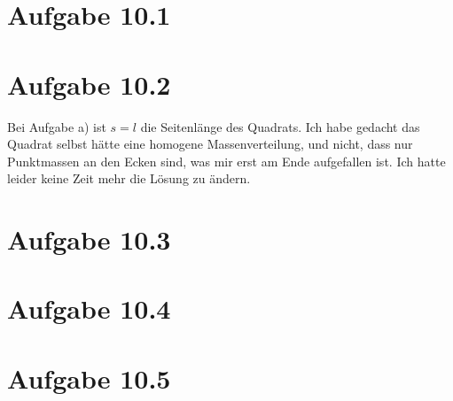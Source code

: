 \documentclass{theozettel}
\begin{document}

\section*{Aufgabe 10.1} 



\section*{Aufgabe 10.2} 

Bei Aufgabe a) ist $s = l$ die Seitenlänge des Quadrats. Ich habe gedacht das Quadrat selbst hätte eine homogene Massenverteilung, und nicht, dass nur Punktmassen an den Ecken sind, was mir erst am Ende aufgefallen ist. Ich hatte leider keine Zeit mehr die Lösung zu ändern.



\section*{Aufgabe 10.3} 



\section*{Aufgabe 10.4} 



\section*{Aufgabe 10.5} 
\end{document}
